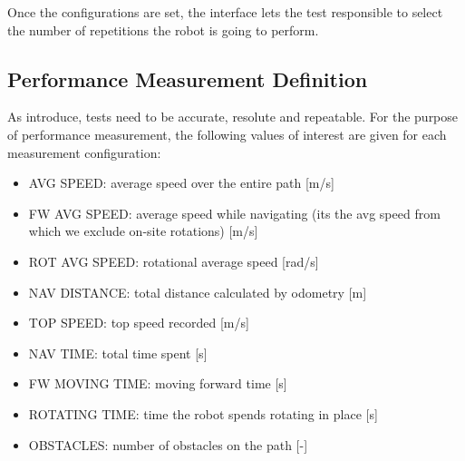 Once the configurations are set, the interface lets the test responsible to select the number of repetitions the robot is going to perform.

\subsection{Performance Measurement Definition}
\label{subsection:performancedef}
As introduce, tests need to be accurate, resolute and repeatable. For the purpose of performance measurement, the  following values of interest are given for each measurement configuration: 
\begin{itemize}
    \item AVG SPEED: average speed over the entire path [m/s]
    \item FW AVG SPEED: average speed while navigating (its the avg speed from which we exclude on-site rotations) [m/s]
    \item ROT AVG SPEED: rotational average speed [rad/s]
    \item NAV DISTANCE: total distance calculated by odometry [m] \item TOP SPEED: top speed recorded [m/s]
    \item NAV TIME: total time spent [s] 
    \item FW MOVING TIME: moving forward time [s]
    \item ROTATING TIME: time the robot spends rotating in place [s]
    \item OBSTACLES: number of obstacles on the path [-]
\end{itemize}

